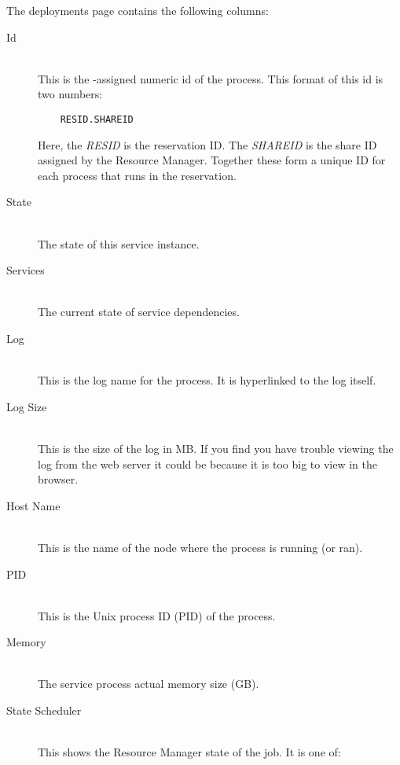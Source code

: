    The deployments page contains the following columns:
   \begin{description}
      \item[Id] \hfill \\
        This is the {\DUCC}-assigned numeric id of the process.  This format of this
        id is two numbers:
\begin{verbatim}
    RESID.SHAREID
\end{verbatim}
        Here, the {\em RESID} is the reservation ID.  The {\em SHAREID} is the 
        share ID assigned by the Resource Manager.  Together these form a unique
        ID for each process that runs in the reservation.
               
      \item[State] \hfill \\
        The state of this service instance.
               
      \item[Services] \hfill \\
        The current state of service dependencies.
                                
      \item[Log] \hfill \\
        This is the log name for the process. It is hyperlinked to the log itself.
        
      \item[Log Size] \hfill \\
        This is the size of the log in MB. If you find you have trouble viewing the log
        from the web server it could be because it is too big to view in the browser.
        
      \item[Host Name] \hfill \\
        This is the name of the node where the process is running (or ran).
        
      \item[PID] \hfill \\
        This is the Unix process ID (PID) of the process.
       
      \item[Memory] \hfill \\
        The service process actual memory size (GB).
                
      \item[State Scheduler] \hfill \\
        This shows the Resource Manager state of the job. It is one of:
        

\end{description}
